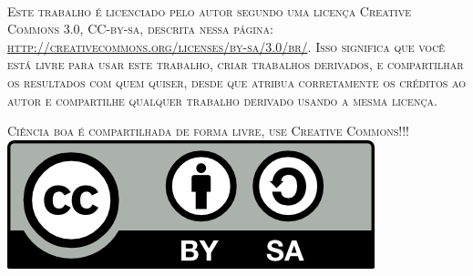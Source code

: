 \begin{titlepage}
\begin{fullwidth}

\HRule \\
\textsc{Este trabalho é licenciado pelo autor segundo uma licença Creative Commons 3.0, CC-by-sa, descrita nessa página: \url{http://creativecommons.org/licenses/by-sa/3.0/br/}. Isso significa que você está livre para usar este trabalho, criar trabalhos derivados, e compartilhar os resultados com quem quiser, desde que atribua corretamente os créditos ao autor e compartilhe qualquer trabalho derivado usando a mesma licença.}\\[0.5cm] 

\begin{center}
\textsc{Ciência boa é compartilhada de forma livre, use Creative Commons!!!}\\[0.5cm]
\includegraphics[scale=1]{./figuras/cc/by-sa.png}
\end{center}
\HRule\\[2.2cm]
\end{fullwidth}
\end{titlepage}